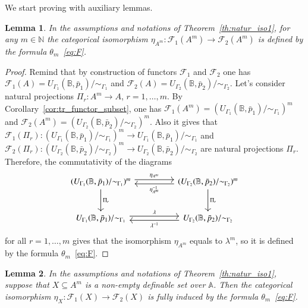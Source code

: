\documentclass[12pt]{article}
\newtheorem{lemma}{Lemma}
\theoremstyle{definition}
\def\N{{\mathbb{N}}}
\def\MA{{\mathbb{A}}}
\def\MB{{\mathbb{B}}}
\def\F{{\mathcal{F}}}
\begin{document}
We start proving with auxiliary lemmas.

\begin{lemma}\label{le:natur_iso0}
    In the assumptions and notations of Theorem~\ref{th:natur_iso1}, for any $m\in \N$ the categorical isomorphism $\eta_{A^m}\colon \F_1(A^m)\to \F_2(A^m)$ is defined by the formula $\theta_m$~\eqref{eq:F}.
\end{lemma}

\begin{proof}
Remind that by construction of functors $\F_1$ and $\F_2$ one has $\F_1(A)=U_{\Gamma_1}(\MB,\bar p_1)/{\sim_{\Gamma_1}}$ and $\F_2(A)=U_{\Gamma_2}(\MB,\bar p_2)/{\sim_{\Gamma_2}}$. Let's consider natural projections $\Pi_r\colon A^m\to A$, $r=1,\ldots,m$. By Corollary~\ref{cor:tr_functor_subset}, one has $\F_1(A^m)=(U_{\Gamma_1}(\MB,\bar p_1)/{\sim_{\Gamma_1}})^m$ and $\F_2(A^m)=(U_{\Gamma_2}(\MB,\bar p_2)/{\sim_{\Gamma_2}})^m$. Also it gives that $\F_1(\Pi_r)\colon (U_{\Gamma_1}(\MB,\bar p_1)/{\sim_{\Gamma_1}})^m\to U_{\Gamma_1}(\MB,\bar p_1)/{\sim_{\Gamma_1}}$ and $\F_2(\Pi_r)\colon (U_{\Gamma_2}(\MB,\bar p_2)/{\sim_{\Gamma_2}})^m\to U_{\Gamma_2}(\MB,\bar p_2)/{\sim_{\Gamma_2}}$ are natural projections $\Pi_r$. Therefore, the commutativity of the diagrams
\begin{equation*}
\begin{tikzcd}[column sep=huge, row sep=large]
(U_{\Gamma_1}(\MB,\bar p_1)/{\sim_{\Gamma_1}})^m 
\arrow[r,leftarrow,shift right,"\eta_{A^m}^{-1}"']
\arrow[r,rightarrow,shift left,swap,"\eta_{A^m}"'] 
\arrow{d}{\Pi_r} 
& (U_{\Gamma_2}(\MB,\bar p_2)/{\sim_{\Gamma_2}})^m 
\arrow{d}{\Pi_r}\\
U_{\Gamma_1}(\MB,\bar p_1)/{\sim_{\Gamma_1}}
\arrow[r,leftarrow,shift right,"\lambda^{-1}"']
\arrow[r,rightarrow,shift left,swap,"\lambda"']  
& U_{\Gamma_2}(\MB,\bar p_2)/{\sim_{\Gamma_2}}
\end{tikzcd}    
\end{equation*}
for all $r=1,\ldots,m$ gives that the isomorphism $\eta_{A^m}$ equals to $\lambda^m$, so it is defined by the formula $\theta_m$~\eqref{eq:F}.
\end{proof}

\begin{lemma}\label{le:natur_iso1}
    In the assumptions and notations of Theorem~\ref{th:natur_iso1}, suppose that $X\subseteq A^m$ is a non-empty definable set over $\MA$. Then the categorical isomorphism $\eta_X\colon \F_1(X)\to \F_2(X)$ is fully induced by the formula $\theta_m$~\eqref{eq:F}.
\end{lemma}
\end{document}
